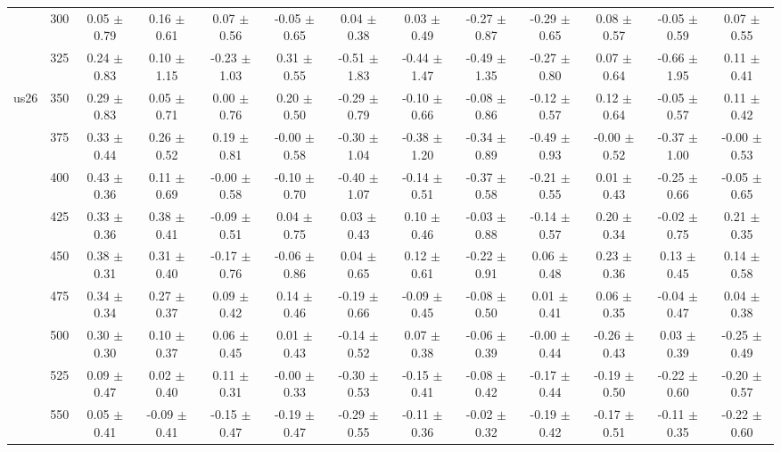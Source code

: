\begin{table}[h]
{\begin{tabular}{
        ccccccccccccc}
 & 300& 0.05 $\pm$ 0.79& 0.16 $\pm$ 0.61& 0.07 $\pm$ 0.56& -0.05 $\pm$ 0.65& 0.04 $\pm$ 0.38& 0.03 $\pm$ 0.49& -0.27 $\pm$ 0.87& -0.29 $\pm$ 0.65& 0.08 $\pm$ 0.57& -0.05 $\pm$ 0.59& 0.07 $\pm$ 0.55 \\ 
 & 325& 0.24 $\pm$ 0.83& 0.10 $\pm$ 1.15& -0.23 $\pm$ 1.03& 0.31 $\pm$ 0.55& -0.51 $\pm$ 1.83& -0.44 $\pm$ 1.47& -0.49 $\pm$ 1.35& -0.27 $\pm$ 0.80& 0.07 $\pm$ 0.64& -0.66 $\pm$ 1.95& 0.11 $\pm$ 0.41 \\ 
\multirow{4}{*}{us26}& 350& 0.29 $\pm$ 0.83& 0.05 $\pm$ 0.71& 0.00 $\pm$ 0.76& 0.20 $\pm$ 0.50& -0.29 $\pm$ 0.79& -0.10 $\pm$ 0.66& -0.08 $\pm$ 0.86& -0.12 $\pm$ 0.57& 0.12 $\pm$ 0.64& -0.05 $\pm$ 0.57& 0.11 $\pm$ 0.42 \\ 
 & 375& 0.33 $\pm$ 0.44& 0.26 $\pm$ 0.52& 0.19 $\pm$ 0.81& -0.00 $\pm$ 0.58& -0.30 $\pm$ 1.04& -0.38 $\pm$ 1.20& -0.34 $\pm$ 0.89& -0.49 $\pm$ 0.93& -0.00 $\pm$ 0.52& -0.37 $\pm$ 1.00& -0.00 $\pm$ 0.53 \\ 
 & 400& 0.43 $\pm$ 0.36& 0.11 $\pm$ 0.69& -0.00 $\pm$ 0.58& -0.10 $\pm$ 0.70& -0.40 $\pm$ 1.07& -0.14 $\pm$ 0.51& -0.37 $\pm$ 0.58& -0.21 $\pm$ 0.55& 0.01 $\pm$ 0.43& -0.25 $\pm$ 0.66& -0.05 $\pm$ 0.65 \\ 
 & 425& 0.33 $\pm$ 0.36& 0.38 $\pm$ 0.41& -0.09 $\pm$ 0.51& 0.04 $\pm$ 0.75& 0.03 $\pm$ 0.43& 0.10 $\pm$ 0.46& -0.03 $\pm$ 0.88& -0.14 $\pm$ 0.57& 0.20 $\pm$ 0.34& -0.02 $\pm$ 0.75& 0.21 $\pm$ 0.35 \\ 
 & 450& 0.38 $\pm$ 0.31& 0.31 $\pm$ 0.40& -0.17 $\pm$ 0.76& -0.06 $\pm$ 0.86& 0.04 $\pm$ 0.65& 0.12 $\pm$ 0.61& -0.22 $\pm$ 0.91& 0.06 $\pm$ 0.48& 0.23 $\pm$ 0.36& 0.13 $\pm$ 0.45& 0.14 $\pm$ 0.58 \\ 
 & 475& 0.34 $\pm$ 0.34& 0.27 $\pm$ 0.37& 0.09 $\pm$ 0.42& 0.14 $\pm$ 0.46& -0.19 $\pm$ 0.66& -0.09 $\pm$ 0.45& -0.08 $\pm$ 0.50& 0.01 $\pm$ 0.41& 0.06 $\pm$ 0.35& -0.04 $\pm$ 0.47& 0.04 $\pm$ 0.38 \\ 
 & 500& 0.30 $\pm$ 0.30& 0.10 $\pm$ 0.37& 0.06 $\pm$ 0.45& 0.01 $\pm$ 0.43& -0.14 $\pm$ 0.52& 0.07 $\pm$ 0.38& -0.06 $\pm$ 0.39& -0.00 $\pm$ 0.44& -0.26 $\pm$ 0.43& 0.03 $\pm$ 0.39& -0.25 $\pm$ 0.49 \\ 
 & 525& 0.09 $\pm$ 0.47& 0.02 $\pm$ 0.40& 0.11 $\pm$ 0.31& -0.00 $\pm$ 0.33& -0.30 $\pm$ 0.53& -0.15 $\pm$ 0.41& -0.08 $\pm$ 0.42& -0.17 $\pm$ 0.44& -0.19 $\pm$ 0.50& -0.22 $\pm$ 0.60& -0.20 $\pm$ 0.57 \\ 
 & 550& 0.05 $\pm$ 0.41& -0.09 $\pm$ 0.41& -0.15 $\pm$ 0.47& -0.19 $\pm$ 0.47& -0.29 $\pm$ 0.55& -0.11 $\pm$ 0.36& -0.02 $\pm$ 0.32& -0.19 $\pm$ 0.42& -0.17 $\pm$ 0.51& -0.11 $\pm$ 0.35& -0.22 $\pm$ 0.60 \\ 

\end{tabular}}
\end{table}
